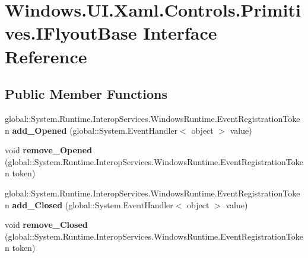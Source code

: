 \hypertarget{interface_windows_1_1_u_i_1_1_xaml_1_1_controls_1_1_primitives_1_1_i_flyout_base}{}\section{Windows.\+U\+I.\+Xaml.\+Controls.\+Primitives.\+I\+Flyout\+Base Interface Reference}
\label{interface_windows_1_1_u_i_1_1_xaml_1_1_controls_1_1_primitives_1_1_i_flyout_base}
\subsection*{Public Member Functions}
\begin{DoxyCompactItemize}
\item 
\mbox{\label{interface_windows_1_1_u_i_1_1_xaml_1_1_controls_1_1_primitives_1_1_i_flyout_base_a7f385a5013f8ec0a8b1a6d77d6a84a3c}} 
global\+::\+System.\+Runtime.\+Interop\+Services.\+Windows\+Runtime.\+Event\+Registration\+Token {\bfseries add\+\_\+\+Opened} (global\+::\+System.\+Event\+Handler$<$ object $>$ value)
\item 
\mbox{\label{interface_windows_1_1_u_i_1_1_xaml_1_1_controls_1_1_primitives_1_1_i_flyout_base_aaf1d9a6eb5c861ece4f282be39177530}} 
void {\bfseries remove\+\_\+\+Opened} (global\+::\+System.\+Runtime.\+Interop\+Services.\+Windows\+Runtime.\+Event\+Registration\+Token token)
\item 
\mbox{\label{interface_windows_1_1_u_i_1_1_xaml_1_1_controls_1_1_primitives_1_1_i_flyout_base_a287be71b4a8d75e70c344f8fb9181cda}} 
global\+::\+System.\+Runtime.\+Interop\+Services.\+Windows\+Runtime.\+Event\+Registration\+Token {\bfseries add\+\_\+\+Closed} (global\+::\+System.\+Event\+Handler$<$ object $>$ value)
\item 
\mbox{\label{interface_windows_1_1_u_i_1_1_xaml_1_1_controls_1_1_primitives_1_1_i_flyout_base_a2325f07fa64baf0f9a5db42d74dc2072}} 
void {\bfseries remove\+\_\+\+Closed} (global\+::\+System.\+Runtime.\+Interop\+Services.\+Windows\+Runtime.\+Event\+Registration\+Token token)

\end{DoxyCompactItemize}
